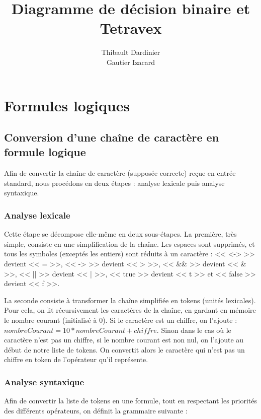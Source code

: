 \documentclass[11pt]{article}
\begin{document}
\title{Diagramme de décision binaire et Tetravex}
\author{Thibault Dardinier\\Gautier Izacard}
\maketitle
\tableofcontents
\newpage

\section{Formules logiques}
\subsection{Conversion d'une chaîne de caractère en formule logique}

Afin de convertir la chaîne de caractère (supposée correcte) reçue en entrée standard, nous procédons en deux étapes : analyse lexicale puis analyse syntaxique.

\subsubsection{Analyse lexicale}

Cette étape se décompose elle-même en deux sous-étapes.
La première, très simple, consiste en une simplification de la chaîne.
Les espaces sont supprimés, et tous les symboles (exceptés les entiers) sont réduits à un caractère : << <-> >> devient << = >>, << -> >> devient << > >>, << \&\& >> devient << \& >>, << || >> devient << | >>, << true >> devient << t >> et << false >> devient << f >>.

La seconde consiste à transformer la chaîne simplifiée en tokens (unités lexicales).
Pour cela, on lit récursivement les caractères de la chaîne, en gardant en mémoire le nombre courant (initialisé à $0$).
Si le caractère est un chiffre, on l'ajoute : $nombreCourant = 10 * nombreCourant + chiffre$.
Sinon dans le cas où le caractère n'est pas un chiffre, si le nombre courant est non nul, on l'ajoute au début de notre liste de tokens.
On convertit alors le caractère qui n'est pas un chiffre en token de l'opérateur qu'il représente.

\subsubsection{Analyse syntaxique}

Afin de convertir la liste de tokens en une formule, tout en respectant les priorités des différents opérateurs, on définit la grammaire suivante :
\end{document}
